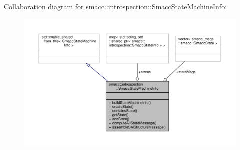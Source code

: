 Collaboration diagram for smacc\+:\+:introspection\+:\+:Smacc\+State\+Machine\+Info\+:\nopagebreak
\begin{figure}[H]
\begin{center}
\leavevmode
\includegraphics[width=350pt]{classsmacc_1_1introspection_1_1SmaccStateMachineInfo__coll__graph}
\end{center}
\end{figure}
